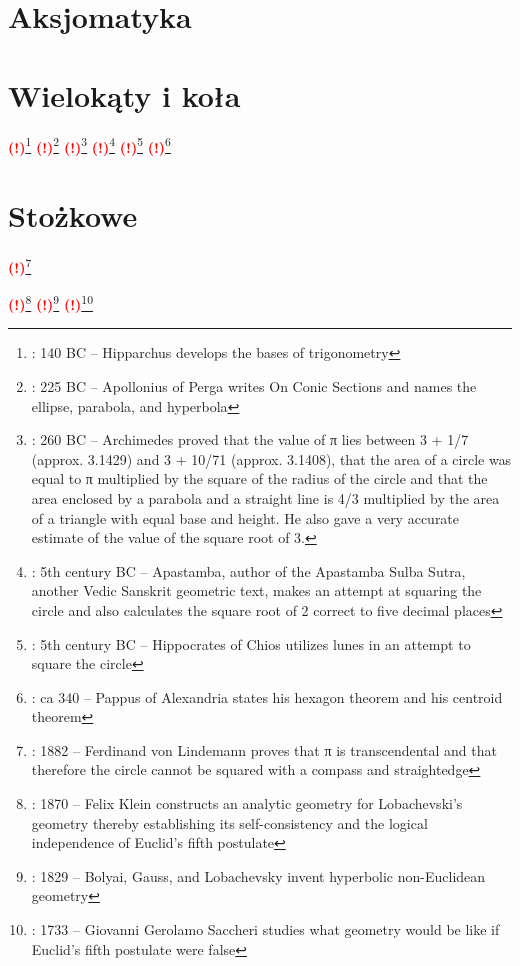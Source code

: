 \documentclass{greaseproof}
\newcommand{\todofoot}[1]{\textcolor{red}{\textbf{(!)}\footnote{\textbf{\color{red}{Do zrobienia}}: #1}}}
\begin{document}


\section{Aksjomatyka}




\section{Wielokąty i koła}


\todofoot{140 BC – Hipparchus develops the bases of trigonometry}
\todofoot{225 BC – Apollonius of Perga writes On Conic Sections and names the ellipse, parabola, and hyperbola}
\todofoot{260 BC – Archimedes proved that the value of π lies between 3 + 1/7 (approx. 3.1429) and 3 + 10/71 (approx. 3.1408), that the area of a circle was equal to π multiplied by the square of the radius of the circle and that the area enclosed by a parabola and a straight line is 4/3 multiplied by the area of a triangle with equal base and height. He also gave a very accurate estimate of the value of the square root of 3.}
\todofoot{5th century BC – Apastamba, author of the Apastamba Sulba Sutra, another Vedic Sanskrit geometric text, makes an attempt at squaring the circle and also calculates the square root of 2 correct to five decimal places}
\todofoot{5th century BC – Hippocrates of Chios utilizes lunes in an attempt to square the circle}
\todofoot{ca 340 – Pappus of Alexandria states his hexagon theorem and his centroid theorem}




\section{Stożkowe}



\todofoot{1882 – Ferdinand von Lindemann proves that π is transcendental and that therefore the circle cannot be squared with a compass and straightedge}


\todofoot{1870 – Felix Klein constructs an analytic geometry for Lobachevski's geometry thereby establishing its self-consistency and the logical independence of Euclid's fifth postulate}
\todofoot{1829 – Bolyai, Gauss, and Lobachevsky invent hyperbolic non-Euclidean geometry}
\todofoot{1733 – Giovanni Gerolamo Saccheri studies what geometry would be like if Euclid's fifth postulate were false}
\end{document}

